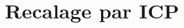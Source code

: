 \documentclass[../CSC_5RO17_TA_TP4.tex]{subfiles}
\begin{document}
\section{Recalage par ICP}
\end{document}
